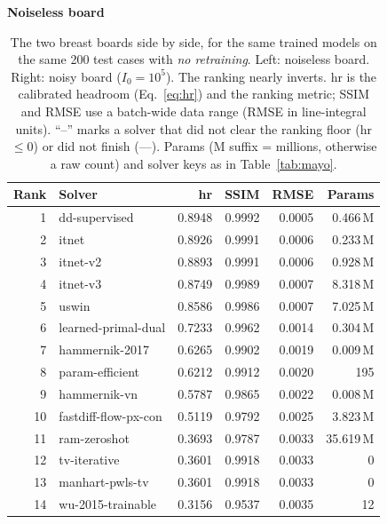 \documentclass[AMA,twocolumn]{USG} %
\begin{document}
\begin{table}[t]
\caption{The two breast boards side by side, for the same trained models on the same 200 test cases with \emph{no retraining}. Left: noiseless board. Right: noisy board ($I_0=10^5$). The ranking nearly inverts. hr is the calibrated headroom (Eq.~\ref{eq:hr}) and the ranking metric; SSIM and RMSE use a batch-wide data range (RMSE in line-integral units). ``--'' marks a solver that did not clear the ranking floor (hr $\le 0$) or did not finish (---). Params (M suffix = millions, otherwise a raw count) and solver keys as in Table~\ref{tab:mayo}.\label{tab:reversal}}
\scriptsize
\setlength{\tabcolsep}{3pt}
\begin{minipage}[t]{0.49\textwidth}
\centering
\textbf{Noiseless board}\\[2pt]
\begin{tabular}{@{}rlrrrr@{}}
\toprule
\textbf{Rank} & \textbf{Solver} & \textbf{hr} & \textbf{SSIM} & \textbf{RMSE} & \textbf{Params} \\
\midrule
1  & dd-supervised        & 0.8948 & 0.9992 & 0.0005 & 0.466\,M \\
2  & itnet                & 0.8926 & 0.9991 & 0.0006 & 0.233\,M \\
3  & itnet-v2             & 0.8893 & 0.9991 & 0.0006 & 0.928\,M \\
4  & itnet-v3             & 0.8749 & 0.9989 & 0.0007 & 8.318\,M \\
5  & uswin                & 0.8586 & 0.9986 & 0.0007 & 7.025\,M \\
6  & learned-primal-dual  & 0.7233 & 0.9962 & 0.0014 & 0.304\,M \\
7  & hammernik-2017       & 0.6265 & 0.9902 & 0.0019 & 0.009\,M \\
8  & param-efficient      & 0.6212 & 0.9912 & 0.0020 & 195 \\
9  & hammernik-vn         & 0.5787 & 0.9865 & 0.0022 & 0.008\,M \\
10 & fastdiff-flow-px-con & 0.5119 & 0.9792 & 0.0025 & 3.823\,M \\
11 & ram-zeroshot         & 0.3693 & 0.9787 & 0.0033 & 35.619\,M \\
12 & tv-iterative         & 0.3601 & 0.9918 & 0.0033 & 0 \\
13 & manhart-pwls-tv      & 0.3601 & 0.9918 & 0.0033 & 0 \\
14 & wu-2015-trainable    & 0.3156 & 0.9537 & 0.0035 & 12 \\

\end{tabular}
\end{minipage}
\end{table}
\end{document}
